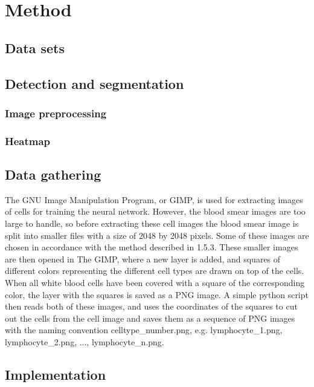 \chapter{Method}\label{cha:intro}

\section{Data sets}


\section{Detection and segmentation}

\subsection{Image preprocessing}

\subsection{Heatmap}



\section{Data gathering}\label{sec:research:history}
The GNU Image Manipulation Program, or GIMP, is used for extracting images of cells for training the neural network. However, the blood smear images are too large to handle, so before extracting these cell images the blood smear image is split into smaller files with a size of 2048 by 2048 pixels. Some of these images are chosen in accordance with the method described in 1.5.3. These smaller images are then opened in The GIMP, where a new layer is added, and squares of different colors representing the different cell types are drawn on top of the cells. When all white blood cells have been covered with a square of the corresponding color, the layer with the squares is saved as a PNG image. A simple python script then reads both of these images, and uses the coordinates of the squares to cut out the cells from the cell image and saves them as a sequence of PNG images with the naming convention celltype\_number.png, e.g. lymphocyte\_1.png, lymphocyte\_2.png, ..., lymphocyte\_n.png.

\section{Implementation}\label{sec:research:history}

